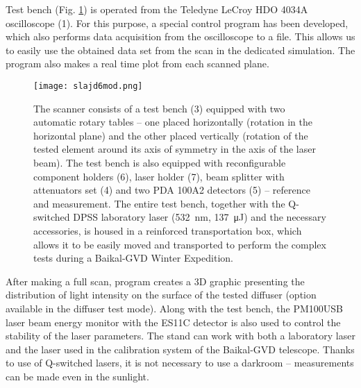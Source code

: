 \documentclass[a4paper,11pt]{article}
\begin{document}
Test bench (Fig. \ref{fig:slajd6}) is operated from the Teledyne LeCroy HDO 4034A oscilloscope (1). For this purpose, a special control program has been developed, which also performs data acquisition from the oscilloscope to a file. This allows us to easily use the obtained data set from the scan in the dedicated simulation. The program also makes a real time plot from each scanned plane.

\begin{figure}[H]
	\vspace*{-1.5ex}
	\begin{minipage}[t]{0.31\textwidth}\vspace{0pt}
		\texttt{[image: slajd6mod.png]}
	\end{minipage}\hfill
	\begin{minipage}[t]{0.62\textwidth}
		\caption{The scanner consists of a test bench (3) equipped with two automatic rotary tables -- one placed horizontally (rotation in the horizontal plane) and the other placed vertically (rotation of the tested element around its axis of symmetry in the axis of the laser beam). The test bench is also equipped with reconfigurable component holders (6), laser holder (7), beam splitter with attenuators set (4) and two PDA 100A2 detectors (5) -- reference and measurement. The entire test bench, together with the Q-switched DPSS laboratory laser (\SI{532}{\nano\meter}, \SI{137}{\micro \joule}) and the necessary accessories, is housed in a reinforced transportation box, which allows it to be easily moved and transported to perform the complex tests during a Baikal-GVD Winter Expedition.}
		\label{fig:slajd6}
	\end{minipage}
\vspace*{-4ex}
	
\end{figure}

After making a full scan, program creates a 3D graphic presenting the distribution of light intensity on the surface of the tested diffuser (option available in the diffuser test mode). Along with the test bench, the PM100USB laser beam energy monitor with the ES11C detector is also used to control the stability of the laser parameters. The stand can work with both a laboratory laser and the laser used in the calibration system of the Baikal-GVD telescope. Thanks to use of Q-switched lasers, it is not necessary to use a darkroom -- measurements can be made even in the sunlight. 
\end{document}
